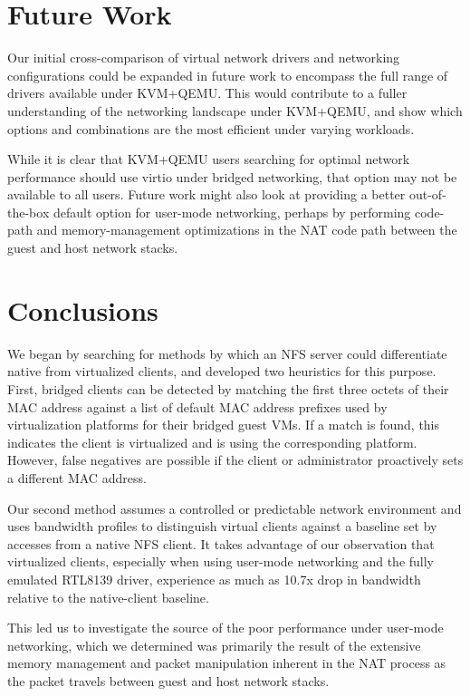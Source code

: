 \documentclass[letterpaper,twocolumn,11pt]{article}
\begin{document}
\section{Future Work}
Our initial cross-comparison of virtual network drivers and networking configurations could be expanded in future work to encompass the full range of drivers available under KVM+QEMU. This would contribute to a fuller understanding of the networking landscape under KVM+QEMU, and show which options and combinations are the most efficient under varying workloads. 

While it is clear that KVM+QEMU users searching for optimal network performance should use virtio under bridged networking, that option may not be available to all users. Future work might also look at providing a better out-of-the-box default option for user-mode networking, perhaps by performing code-path and memory-management optimizations in the NAT code path between the guest and host network stacks.

\section{Conclusions}
We began by searching for methods by which an NFS server could differentiate native from virtualized clients, and developed two heuristics for this purpose. First, bridged clients can be detected by matching the first three octets of their MAC address against a list of default MAC address prefixes used by virtualization platforms for their bridged guest VMs. If a match is found, this indicates the client is virtualized and is using the corresponding platform. However, false negatives are possible if the client or administrator proactively sets a different MAC address. 

Our second method assumes a controlled or predictable network environment and uses bandwidth profiles to distinguish virtual clients against a baseline set by accesses from a native NFS client. It takes advantage of our observation that virtualized clients, especially when using user-mode networking and the fully emulated RTL8139 driver, experience as much as 10.7x drop in bandwidth relative to the native-client baseline. 

This led us to investigate the source of the poor performance under user-mode networking, which we determined was primarily the result of the extensive memory management and packet manipulation inherent in the NAT process as the packet travels between guest and host network stacks.
\end{document}

